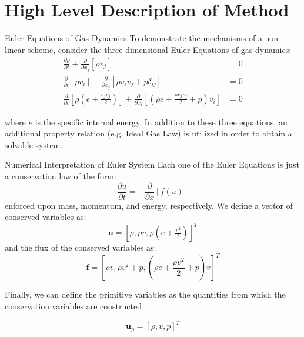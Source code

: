 \documentclass[9pt]{beamer}
\begin{document}
\section{High Level Description of Method}

\begin{frame}{Euler Equations of Gas Dynamics}
To demonstrate the mechanisms of a non-linear scheme, consider the three-dimensional Euler Equations of gas dynamics:
\begin{align}
\frac{\partial \rho}{\partial t}+\frac{\partial}{\partial x_j}[\rho v_j] &=0\label{eq:MassBalance}\\
\frac{\partial}{\partial t}[\rho v_i]+\frac{\partial}{\partial x_j}[\rho v_iv_j+p\delta_{ij}]&=0\label{eq:MomentaBalance}\\
\frac{\partial}{\partial t}[\rho(e+\tfrac{v_jv_j}{2})]+\frac{\partial}{\partial x_i}[(\rho e+\tfrac{\rho v_jv_j}{2} +p)v_i]&=0\label{eq:EnergyBalance}
\end{align}

where $e$ is the specific internal energy. In addition to these three equations, an additional property relation (e.g. Ideal Gas Law) is utilized in order to obtain a solvable system. 
\end{frame}


\begin{frame}{Numerical Interpretation of Euler System}
Each one of the Euler Equations is just a conservation law of the form:
\begin{equation}
	\frac{\partial u}{\partial t}=-\frac{\partial}{\partial x}[f(u)]\label{eq:ConservationLaw}
\end{equation}
 enforced upon mass, momentum, and energy, respectively. We define a vector of conserved variables as: $$\textbf{u}=[\rho,\rho v,\rho(e+\tfrac{v^2}{2})]^T$$ and the flux of the conserved variables as:
\begin{equation}
	\textbf{f} = [\rho v, \rho v^2 + p, (\rho e +\frac{\rho v^2}{2}+p)v]^T\label{eq: Flux Functions}
\end{equation}

Finally, we can define the primitive variables as the quantities from which the conservation variables are constructed

\begin{equation}
\textbf{u}_p=[\rho,v,p]^T
\end{equation}

\end{frame}
\end{document}
